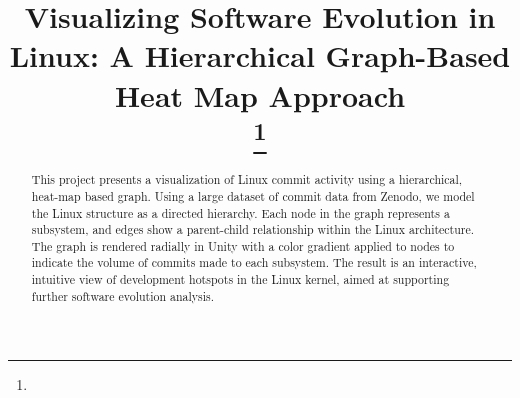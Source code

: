 \documentclass[conference]{IEEEtran}
\begin{document}
\title{Visualizing Software Evolution in Linux: A Hierarchical Graph-Based Heat Map Approach\\

\thanks{}
}

\author{
\and
{}
}



\maketitle

\begin{abstract}
This project presents a visualization of Linux commit activity using a hierarchical, heat-map based graph. Using a large dataset of commit data from Zenodo, we model the Linux structure as a directed hierarchy. Each node in the graph represents a subsystem, and edges show a parent-child relationship within the Linux architecture. The graph is rendered radially in Unity with a color gradient applied to nodes to indicate the volume of commits made to each subsystem. The result is an interactive, intuitive view of development hotspots in the Linux kernel, aimed at supporting further software evolution analysis. 
\end{abstract}
\end{document}
